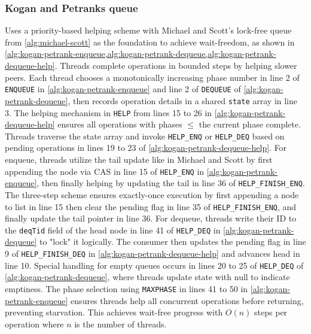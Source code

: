 \subsubsection{Kogan and Petranks queue} 
Uses a priority-based helping scheme with Michael and Scott's lock-free queue from \cref{alg:michael-scott} as the foundation to achieve wait-freedom, as shown in \cref{alg:kogan-petrank-enqueue,alg:kogan-petrank-dequeue,alg:kogan-petrank-dequeue-help}. Threads complete operations in bounded steps by helping slower peers. Each thread chooses a monotonically increasing phase number in line 2 of \texttt{ENQUEUE} in \cref{alg:kogan-petrank-enqueue} and line 2 of \texttt{DEQUEUE} of \cref{alg:kogan-petrank-dequeue}, then records operation details in a shared \texttt{state} array in line 3. The helping mechanism in \texttt{HELP} from lines 15 to 26 in \cref{alg:kogan-petrank-dequeue-help} ensures all operations with phases $\leq$ the current phase complete. Threads traverse the state array and invoke \texttt{HELP\_ENQ} or \texttt{HELP\_DEQ} based on pending operations in lines 19 to 23 of \cref{alg:kogan-petrank-dequeue-help}. For enqueue, threads utilize the tail update like in Michael and Scott by first appending the node via \ac{CAS} in line 15 of \texttt{HELP\_ENQ} in \cref{alg:kogan-petrank-enqueue}, then finally helping by updating the tail in line 36 of \texttt{HELP\_FINISH\_ENQ}. The three-step scheme ensures exactly-once execution by first appending a node to list in line 15 then clear the pending flag in line 35 of \texttt{HELP\_FINISH\_ENQ}, and finally update the tail pointer in line 36. For dequeue, threads write their ID to the \texttt{deqTid} field of the head node in line 41 of \texttt{HELP\_DEQ} in \cref{alg:kogan-petrank-dequeue} to "lock" it logically. The consumer then updates the pending flag in line 9 of \texttt{HELP\_FINISH\_DEQ} in \cref{alg:kogan-petrank-dequeue-help} and advances head in line 10. Special handling for empty queues occurs in lines 20 to 25 of \texttt{HELP\_DEQ} of \cref{alg:kogan-petrank-dequeue}, where threads update state with null to indicate emptiness. The phase selection using \texttt{MAXPHASE} in lines 41 to 50 in \cref{alg:kogan-petrank-enqueue} ensures threads help all concurrent operations before returning, preventing starvation. This achieves wait-free progress with $O(n)$ steps per operation where $n$ is the number of threads. \cite{Kogan2011WaitFreeQueues}

